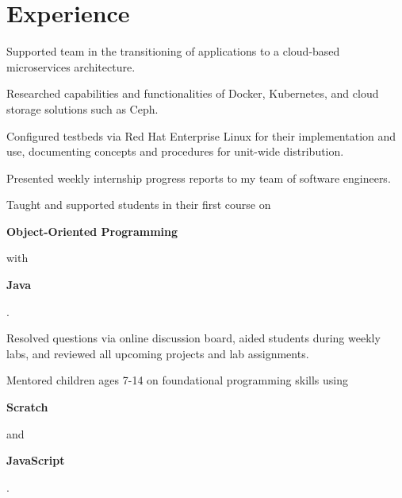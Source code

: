 \documentclass[]{deedy-resume-openfont}
\begin{document}
\section{Experience}


\begin{tightemize}
\item Supported team in the transitioning of applications to a cloud-based microservices architecture.
\item Researched capabilities and functionalities of Docker, Kubernetes, and cloud storage solutions such as Ceph.
\item Configured testbeds via Red Hat Enterprise Linux for their implementation and use, documenting concepts and procedures for unit-wide distribution.
\item Presented weekly internship progress reports to my team of software engineers.
\end{tightemize}
\sectionsep

\begin{tightemize}
\item Taught and supported students in their first course on {\fontsize{9.5pt}{9.5pt}\selectfont\raggedright\bfseries{Object-Oriented Programming}} with {\fontsize{9.5pt}{9.5pt}\selectfont\raggedright\bfseries{Java}}.
\item Resolved questions via online discussion board, aided students during weekly labs, and reviewed all upcoming projects and lab assignments.
\end{tightemize}
\sectionsep

\begin{tightemize}
\item Mentored children ages 7-14 on foundational programming skills using {\fontsize{9.5pt}{9.5pt}\selectfont\raggedright\bfseries{Scratch}} and {\fontsize{9.5pt}{9.5pt}\selectfont\raggedright\bfseries{JavaScript}}.
\end{tightemize}
\sectionsep
\end{document}
